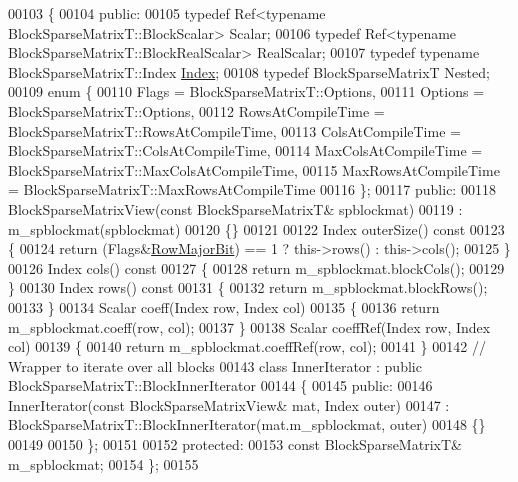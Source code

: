 \begin{DoxyCode}
00103 \{
00104   \textcolor{keyword}{public}:
00105     \textcolor{keyword}{typedef} Ref<typename BlockSparseMatrixT::BlockScalar> Scalar;
00106     \textcolor{keyword}{typedef} Ref<typename BlockSparseMatrixT::BlockRealScalar> RealScalar;
00107     \textcolor{keyword}{typedef} \textcolor{keyword}{typename} BlockSparseMatrixT::Index \hyperlink{namespace_eigen_a62e77e0933482dafde8fe197d9a2cfde}{Index};
00108     \textcolor{keyword}{typedef}  BlockSparseMatrixT Nested;
00109     \textcolor{keyword}{enum} \{
00110       Flags = BlockSparseMatrixT::Options,
00111       Options = BlockSparseMatrixT::Options,
00112       RowsAtCompileTime = BlockSparseMatrixT::RowsAtCompileTime,
00113       ColsAtCompileTime = BlockSparseMatrixT::ColsAtCompileTime,
00114       MaxColsAtCompileTime = BlockSparseMatrixT::MaxColsAtCompileTime,
00115       MaxRowsAtCompileTime = BlockSparseMatrixT::MaxRowsAtCompileTime
00116     \};
00117   \textcolor{keyword}{public}:
00118     BlockSparseMatrixView(\textcolor{keyword}{const} BlockSparseMatrixT& spblockmat)
00119      : m\_spblockmat(spblockmat)
00120     \{\}
00121 
00122     Index outerSize()\textcolor{keyword}{ const}
00123 \textcolor{keyword}{    }\{
00124       \textcolor{keywordflow}{return} (Flags&\hyperlink{group__flags_gae4f56c2a60bbe4bd2e44c5b19cbe8762}{RowMajorBit}) == 1 ? this->rows() : this->cols();
00125     \}
00126     Index cols()\textcolor{keyword}{ const}
00127 \textcolor{keyword}{    }\{
00128       \textcolor{keywordflow}{return} m\_spblockmat.blockCols();
00129     \}
00130     Index rows()\textcolor{keyword}{ const}
00131 \textcolor{keyword}{    }\{
00132       \textcolor{keywordflow}{return} m\_spblockmat.blockRows();
00133     \}
00134     Scalar coeff(Index row, Index col)
00135     \{
00136       \textcolor{keywordflow}{return} m\_spblockmat.coeff(row, col);
00137     \}
00138     Scalar coeffRef(Index row, Index col)
00139     \{
00140       \textcolor{keywordflow}{return} m\_spblockmat.coeffRef(row, col);
00141     \}
00142     \textcolor{comment}{// Wrapper to iterate over all blocks}
00143     \textcolor{keyword}{class }InnerIterator : \textcolor{keyword}{public} BlockSparseMatrixT::BlockInnerIterator
00144     \{
00145       \textcolor{keyword}{public}:
00146       InnerIterator(\textcolor{keyword}{const} BlockSparseMatrixView& mat, Index outer)
00147           : BlockSparseMatrixT::BlockInnerIterator(mat.m\_spblockmat, outer)
00148       \{\}
00149 
00150     \};
00151 
00152   \textcolor{keyword}{protected}:
00153     \textcolor{keyword}{const} BlockSparseMatrixT& m\_spblockmat;
00154 \};
00155 

\end{DoxyCode}
